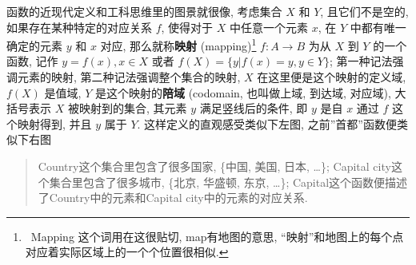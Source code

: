 函数的近现代定义和工科思维里的图景就很像, 考虑集合 \(X\) 和 \(Y\),
且它们不是空的, 如果存在某种特定的对应关系 \(f\), 使得对于 \(X\)
中任意一个元素 \(x\), 在 \(Y\) 中都有唯一确定的元素 \(y\) 和 \(x\) 对应,
那么就称\textbf{映射} (mapping)\footnote{~Mapping 这个词用在这很贴切,
  map有地图的意思,
  ``映射''和地图上的每个点对应着实际区域上的一个个位置很相似.}
\(f: A\rightarrow B\) 为从 \(X\) 到 \(Y\) 的一个函数, 记作
\(y=f(x), x\in X\) 或者 \(f(X)=\{y|f(x)=y, y\in Y\}\);
第一种记法强调元素的映射, 第二种记法强调整个集合的映射, \(X\)
在这里便是这个映射的定义域, \(f(X)\) 是值域, \(Y\)
是这个映射的\textbf{陪域} (codomain, 也叫做上域, 到达域, 对应域),
大括号表示 \(X\) 被映射到的集合, 其元素 \(y\) 满足竖线后的条件, 即 \(y\)
是自 \(x\) 通过 \(f\) 这个映射得到, 并且 \(y\) 属于 \(Y\).
这样定义的直观感受类似下左图, 之前''首都''函数便类似下右图

\begin{quote}
Country这个集合里包含了很多国家, \{中国, 美国, 日本, \ldots\}; Capital
city这个集合里包含了很多城市, \{北京, 华盛顿, 东京, \ldots\};
Capital这个函数便描述了Country中的元素和Capital city中的元素的对应关系.
\end{quote}
